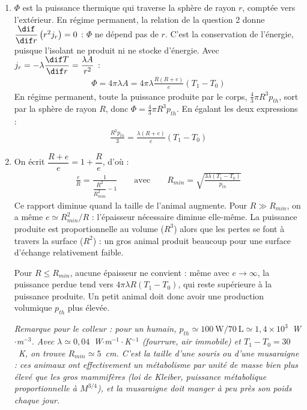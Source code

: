 \begin{correction}
\begin{enumerate}
	\item $\Phi$ est la puissance thermique qui traverse la sphère de rayon $r$, comptée vers l'extérieur. En régime permanent, la relation de la question 2 donne $\dfrac{\dif}{\dif r}\left(r^2j_r\right)=0$ : $\Phi$ ne dépend pas de $r$. C'est la conservation de l'énergie, puisque l'isolant ne produit ni ne stocke d'énergie. Avec $j_r=-\lambda\dfrac{\dif T}{\dif r}=\dfrac{\lambda A}{r^2}$ :
	\begin{align*}
		\Phi=4\pi\lambda A=4\pi\lambda\frac{R(R+e)}{e}(T_1-T_0)
	\end{align*}
	En régime permanent, toute la puissance produite par le corps, $\frac{4}{3}\pi R^3p_{th}$, sort par la sphère de rayon $R$, donc $\Phi=\frac{4}{3}\pi R^3p_{th}$. En égalant les deux expressions :
	\begin{align*}
		\boxed{\frac{R^2p_{th}}{3}=\frac{\lambda (R+e)}{e}(T_1-T_0)}
	\end{align*}

	\item On écrit $\dfrac{R+e}{e}=1+\dfrac{R}{e}$, d'où :
	\begin{align*}
		\boxed{\frac{e}{R}=\frac{1}{\dfrac{R^2}{R_{min}^2}-1}} \qquad\text{avec}\qquad R_{min}=\sqrt{\frac{3\lambda(T_1-T_0)}{p_{th}}}
	\end{align*}
	Ce rapport diminue quand la taille de l'animal augmente. Pour $R\gg R_{min}$, on a même $e\simeq R_{min}^2/R$ : l'épaisseur nécessaire diminue elle-même. La puissance produite est proportionnelle au volume ($R^3$) alors que les pertes se font à travers la surface ($R^2$) : un gros animal produit beaucoup pour une surface d'échange relativement faible.

	Pour $R\leqslant R_{min}$, aucune épaisseur ne convient : même avec $e\to\infty$, la puissance perdue tend vers $4\pi\lambda R(T_1-T_0)$, qui reste supérieure à la puissance produite. Un petit animal doit donc avoir une production volumique $p_{th}$ plus élevée.

	\textit{Remarque pour le colleur : pour un humain, $p_{th}\simeq 100~\text{W}/70~\text{L}\simeq1{,}4\times10^{3}$~W$\cdot$m$^{-3}$. Avec $\lambda\simeq0{,}04$~W$\cdot$m$^{-1}\cdot$K$^{-1}$ (fourrure, air immobile) et $T_1-T_0=30$~K, on trouve $R_{min}\simeq5$~cm. C'est la taille d'une souris ou d'une musaraigne : ces animaux ont effectivement un métabolisme par unité de masse bien plus élevé que les gros mammifères (loi de Kleiber, puissance métabolique proportionnelle à $M^{3/4}$), et la musaraigne doit manger à peu près son poids chaque jour.}

\end{enumerate}

\end{correction}

